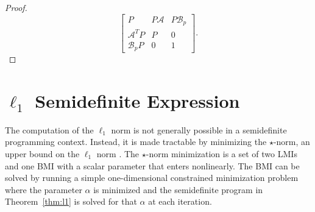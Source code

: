 \begin{proof}
	\begin{equation*}
		\begin{bmatrix}
			P & P\mathcal{A} & P\mathcal{B}_p \\
			\mathcal{A}^TP & P & 0 \\
			\mathcal{B}_pP & 0 & 1
		\end{bmatrix}.
	\end{equation*}
\end{proof}

\section{$\ell_1$ Semidefinite Expression}
\label{sec:opt-l1}

The computation of the $\ell_1$ norm is not generally possible in a semidefinite programming context. Instead, it is made tractable by minimizing the $\star$-norm, an upper bound on the $\ell_1$ norm \cite{Venkatesh1995}. The $\star$-norm minimization is a set of two \gls{LMI}s and one \gls{BMI} with a scalar parameter that enters nonlinearly. The \gls{BMI} can be solved by running a simple one-dimensional constrained minimization problem where the parameter $\alpha$ is minimized and the semidefinite program in Theorem~\ref{thm:l1} is solved for that $\alpha$ at each iteration.

